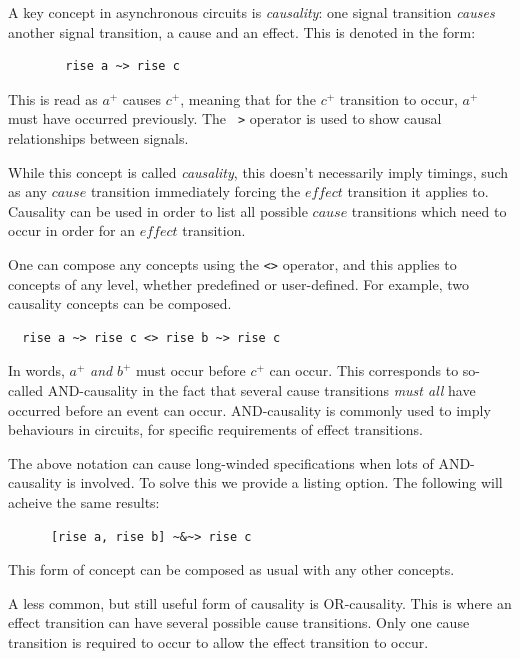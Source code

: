 \documentclass[british,conference,compsoc]{IEEEtran}
\begin{document}
A key concept in asynchronous circuits is \emph{causality}:
one signal transition \emph{causes} another signal transition, a cause and an 
effect. This is denoted in the form: 

\begin{verbatim}
	    rise a ~> rise c
\end{verbatim}

\vspace{-1mm}

This is read as $a^{+}$ causes $c^{+}$, meaning that for the $c^{+}$ transition 
to occur, $a^{+}$ must have occurred previously. The 
\texttt{~>}
operator is used to show causal relationships between signals.
 
While this concept is called \emph{causality}, this doesn't necessarily imply
timings, such as any $\mathit{cause}$ transition immediately forcing the
 $\mathit{effect}$ transition it applies to. Causality can be used in order to
list all possible $\mathit{cause}$ transitions which need to occur in order
 for an $\mathit{effect}$ transition.

One can compose any concepts using the \texttt{<>} 
operator, and this applies
to concepts of any level, whether predefined or user-defined. For example, 
two causality concepts can be composed.

\begin{verbatim}
  rise a ~> rise c <> rise b ~> rise c
\end{verbatim}

In words, $a^{+}$ \emph{and} $b^{+}$ must occur before $c^{+}$ can occur. 
This corresponds to so-called AND-causality in the fact that several cause 
transitions \emph{must all} have occurred before an event can occur. 
AND-causality is commonly used to imply behaviours in circuits, for specific 
requirements of effect transitions.  

The above notation can cause long-winded specifications when lots of 
AND-causality is involved. To solve this we provide a listing option. The 
following will acheive the same results:

\begin{verbatim}
      [rise a, rise b] ~&~> rise c
\end{verbatim}

This form of concept can be composed as usual with any other concepts.

A less common, but still useful form of causality is OR-causality. This is 
where an effect transition can have several possible cause transitions. Only 
one cause transition is required to occur to allow the effect transition to 
occur. 
\end{document}
